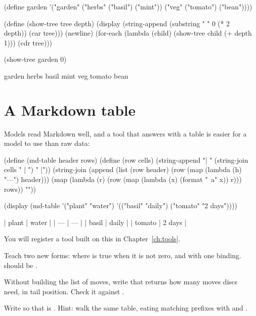 \begin{scm}
(define garden
  '("garden" ("herbs" ("basil") ("mint")) ("veg" ("tomato") ("bean"))))

(define (show-tree tree depth)
  (display (string-append (substring "            " 0 (* 2 depth)) (car tree)))
  (newline)
  (for-each (lambda (child) (show-tree child (+ depth 1))) (cdr tree)))

(show-tree garden 0)
\end{scm}

\begin{txt}
garden
  herbs
    basil
    mint
  veg
    tomato
    bean
\end{txt}

\section{A Markdown table}

Models read Markdown well, and a tool that answers with a table is easier
for a model to use than raw data:

\begin{scm}
(define (md-table header rows)
  (define (row cells) (string-append "| " (string-join cells " | ") " |"))
  (string-join
   (append (list (row header) (row (map (lambda (h) "---") header)))
           (map (lambda (r) (row (map (lambda (x) (format "~a" x)) r))) rows))
   "\n"))

(display (md-table '("plant" "water") '(("basil" "daily") ("tomato" "2 days"))))
\end{scm}

\begin{txt}
| plant | water |
| --- | --- |
| basil | daily |
| tomato | 2 days |
\end{txt}

You will register a tool built on this in Chapter~\ref{ch:tools}.

\begin{puzzle}
Teach  two new forms:  where
 is true when it is not zero, and  with one binding. 
should be .
\end{puzzle}

\begin{puzzle}
Without building the list of moves, write  that
returns how many moves  discs need, in tail position. Check it
against .
\end{puzzle}

\begin{puzzle}
Write  so that  is
. Hint: walk the same table, eating matching prefixes with
 and .
\end{puzzle}
